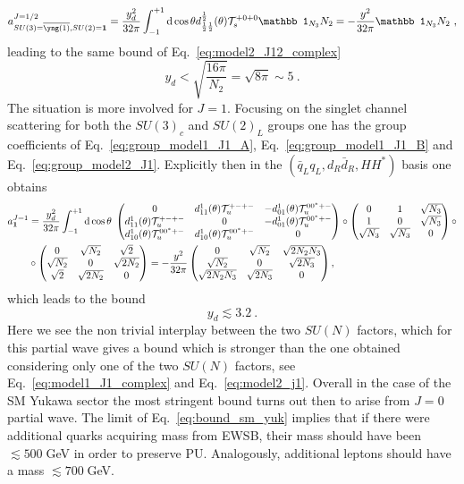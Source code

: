 \documentclass[a4paper,11pt]{article}
\newcommand{\be}{\begin{equation}}
\newcommand{\ee}{\end{equation}}
\newcommand{\nn}{\nonumber}
\begin{document}
\be
a^{J=1/2}_{SU(3)= {{\overline{\tiny{\yng(1)}}}},SU(2)={\bf 1}}= \frac{y_d^2}{32\pi} \int_{-1}^{+1}{\rm d}\cos\theta d^\frac{1}{2}_{\frac{1}{2}\frac{1}{2}}(\theta) {\cal T}_s^{+0+0}
{\mathbb 1}_{N_3} N_2 = -\frac{y^2}{32\pi} {\mathbb 1}_{N_3} N_2 \ ,
\ee 
leading to the same bound of Eq.~\eqref{eq:model2_J12_complex}
\be
y_d < \sqrt{\frac{16\pi}{N_2}} = \sqrt{8 \pi} \sim 5 \ .
\ee
The situation is more involved for $J=1$. Focusing on the singlet channel scattering for both the $SU(3)_c$ and $SU(2)_L$ groups one has the group coefficients of Eq.~\eqref{eq:group_model1_J1_A}, Eq.~\eqref{eq:group_model1_J1_B} and Eq.~\eqref{eq:group_model2_J1}.
Explicitly then in the $(\bar q_L q_L, d_R \bar d_R, H H^*)$ basis one obtains
\begin{align}
\label{eq:modelSM_j1}
a^{J=1}_{{\bf 1}} & =
\frac{y_d^2}{32\pi}
 \int_{-1}^{+1}{\rm d}\cos\theta \;
%
%
\begin{pmatrix}
0 & d^1_{11}(\theta){\cal{T}}_u^{+-+-} & -d^1_{01}(\theta) {\cal{T}}_u^{00^*+-} \\
d^1_{11}(\theta){\cal{T}}_u^{+-+-}& 0 &  -d^1_{01}(\theta){\cal{T}}_u^{00^*+-} \\
 d^1_{10}(\theta){\cal{T}}_u^{00^*+-} &d^1_{10}(\theta) {\cal{T}}_u^{00^*+-}& 0 \\ 
\end{pmatrix}
\circ
\begin{pmatrix}
0 & 1 & \sqrt{N_3} \\
1 & 0 &  \sqrt{N_3} \\
 \sqrt{N_3} &  \sqrt{N_3} & 0  
\end{pmatrix} \nn \circ \\
& \circ  
\begin{pmatrix}
0 & \sqrt{N_2} & \sqrt{2} \\
\sqrt{N_2} & 0 & \sqrt{2N_2} \\
\sqrt{2}&  \sqrt{2N_2} & 0
\end{pmatrix}  
%
 =- \frac{y^2}{32\pi}
\begin{pmatrix}
0 & \sqrt{N_2} & \sqrt{2 N_2 N_3} \\
\sqrt{N_2} & 0 & \sqrt{2 N_3} \\
\sqrt{2 N_2 N_3} & \sqrt{2 N_3} & 0 
\end{pmatrix} , 
\end{align}
which leads to the bound
\be
y_d \lesssim 3.2 \ .
\ee
Here we see the non trivial interplay between the two $SU(N)$ factors, which for this partial wave gives a bound which is stronger than the one obtained considering only one of the two $SU(N)$ factors, see Eq.~\eqref{eq:model1_J1_complex} and Eq.~\eqref{eq:model2_j1}.
Overall in the case of the SM Yukawa sector the most stringent bound turns out then to arise from $J=0$ partial wave. The limit of Eq.~\eqref{eq:bound_sm_yuk} implies that if there were additional quarks acquiring mass from EWSB, their mass should have been $\lesssim 500\;$GeV
in order to preserve PU. Analogously,  additional leptons should have a mass $\lesssim 700\;$GeV.
\end{document}
